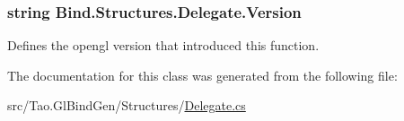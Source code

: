\hypertarget{class_bind_1_1_structures_1_1_delegate_a25ffac475b0854ec8f8bebfac7a99875}{
\subsubsection[{Version}]{\setlength{\rightskip}{0pt plus 5cm}string Bind.Structures.Delegate.Version}}
\label{class_bind_1_1_structures_1_1_delegate_a25ffac475b0854ec8f8bebfac7a99875}


Defines the opengl version that introduced this function. 



The documentation for this class was generated from the following file:\begin{DoxyCompactItemize}
\item 
src/Tao.GlBindGen/Structures/\hyperlink{_delegate_8cs}{Delegate.cs}\end{DoxyCompactItemize}
